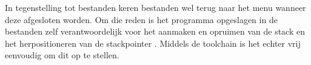In tegenstelling tot  bestanden keren  bestanden wel terug naar het menu wanneer deze afgesloten worden. Om die reden is het programma opgeslagen in de  bestanden zelf verantwoordelijk voor het aanmaken en opruimen van de stack en het herpositioneren van de stackpointer . Middels de  toolchain is het echter vrij eenvoudig om dit op te stellen.